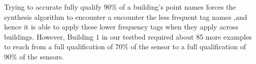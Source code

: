Trying to accurate fully qualify 90\% of a building's point names forces the synthesis algorithm to encounter a encounter the less frequent tag names ,and hence it is able to apply these lower frequency tags when they apply across buildings. However, Building $1$ in our testbed required about 85 more examples to reach from a full qualification of 70\% of the sensor to a full qualification of 90\% of the sensors. 
%
%
%
%

